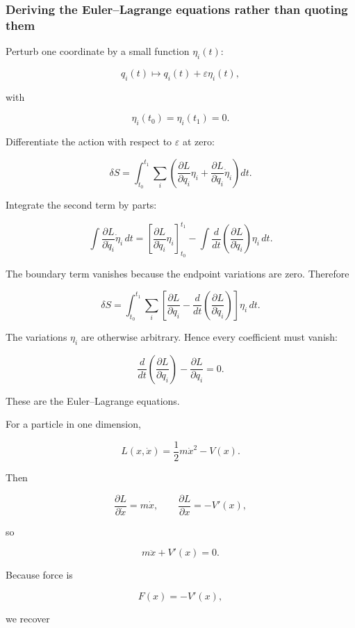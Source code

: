 \subsubsection{Deriving the Euler--Lagrange equations rather than quoting them}\label{02-foundations-ii-ch025-deriving-the-eulerlagrange-equations-rather-than-quoting-them}

Perturb one coordinate by a small function \(\eta_i(t)\):

\[
q_i(t)\mapsto q_i(t)+\varepsilon\eta_i(t),
\]

with

\[
\eta_i(t_0)=\eta_i(t_1)=0.
\]

Differentiate the action with respect to \(\varepsilon\) at zero:

\[
\delta S
=
\int_{t_0}^{t_1}
\sum_i
\left(
\frac{\partial L}{\partial q_i}\eta_i
+
\frac{\partial L}{\partial \dot q_i}\dot\eta_i
\right)
dt.
\]

Integrate the second term by parts:

\[
\int
\frac{\partial L}{\partial\dot q_i}
\dot\eta_i\,dt
=
\left[
\frac{\partial L}{\partial\dot q_i}\eta_i
\right]_{t_0}^{t_1}
-
\int
\frac{d}{dt}
\left(
\frac{\partial L}{\partial\dot q_i}
\right)\eta_i\,dt.
\]

The boundary term vanishes because the endpoint variations are zero. Therefore

\[
\delta S
=
\int_{t_0}^{t_1}
\sum_i
\left[
\frac{\partial L}{\partial q_i}
-
\frac{d}{dt}
\left(
\frac{\partial L}{\partial\dot q_i}
\right)
\right]
\eta_i\,dt.
\]

The variations \(\eta_i\) are otherwise arbitrary. Hence every coefficient must vanish:

\[
\boxed{
\frac{d}{dt}
\left(
\frac{\partial L}{\partial\dot q_i}
\right)
-
\frac{\partial L}{\partial q_i}
=
0
}.
\]

These are the Euler--Lagrange equations.

For a particle in one dimension,

\[
L(x,\dot x)=\frac12m\dot x^2-V(x).
\]

Then

\[
\frac{\partial L}{\partial\dot x}=m\dot x,
\qquad
\frac{\partial L}{\partial x}=-V'(x),
\]

so

\[
m\ddot x+V'(x)=0.
\]

Because force is

\[
F(x)=-V'(x),
\]

we recover

